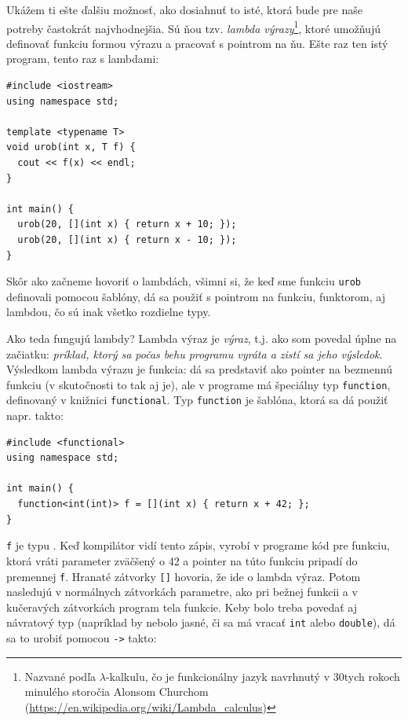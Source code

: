 \documentclass[10pt]{article}
\def\prg{\lstinline}
\def\ods{\vspace*{10pt}}
\begin{document}
{\ods
Ukážem ti ešte ďalšiu možnosť, ako dosiahnuť to isté, ktorá bude pre naše potreby
častokrát najvhodnejšia. Sú ňou tzv. {\em lambda výrazy}\footnote{%
  Nazvané podľa $\lambda$-kalkulu, čo je funkcionálny jazyk navrhnutý v 30tych rokoch
  minulého storočia Alonsom Churchom (\url{https://en.wikipedia.org/wiki/Lambda_calculus})
}, ktoré umožňujú definovať funkciu formou výrazu a pracovať s pointrom na ňu.
Ešte raz ten istý program, tento raz s lambdami:

\begin{lstlisting}
#include <iostream>
using namespace std;

template <typename T>
void urob(int x, T f) {
  cout << f(x) << endl;
}

int main() {
  urob(20, [](int x) { return x + 10; });
  urob(20, [](int x) { return x - 10; });
}
\end{lstlisting}

Skôr ako začneme hovoriť o lambdách, všimni si, že keď sme funkciu {\tt urob}
definovali pomocou šablóny, dá sa použiť s pointrom na funkciu, funktorom, aj lambdou,
čo sú inak všetko rozdielne typy.

\ods Ako teda fungujú lambdy? Lambda výraz je {\em výraz}, t.j. ako som povedal úplne 
na začiatku: {\em príklad, ktorý
sa počas behu programu vyráta a zistí sa jeho výsledok}. Výsledkom lambda výrazu je 
funkcia: dá sa predstaviť ako pointer na bezmennú funkciu (v skutočnosti to tak aj je),
ale v programe má špeciálny typ {\tt function}, definovaný v knižnici {\tt functional}.
Typ {\tt function} je šablóna, ktorá sa dá použiť napr. takto:

\begin{lstlisting}
#include <functional>
using namespace std;

int main() {
  function<int(int)> f = [](int x) { return x + 42; };
}
\end{lstlisting}


{\tt f} je typu \cmd{funkcia, ktorá má parameter \prg!int! a vracia \prg!int!}.
Keď kompilátor vidí tento zápis, vyrobí v programe kód pre funkciu, ktorá vráti 
parameter zväčšený o 42 a pointer na túto funkciu pripadí do premennej {\tt f}.
Hranaté zátvorky {\tt []} hovoria, že ide o lambda výraz. Potom nasledujú
v normálnych zátvorkách parametre, ako pri bežnej funkcii a v kučeravých zátvorkách program
tela funkcie. Keby bolo treba povedať aj návratový typ (napríklad by nebolo
jasné, či sa má vracať \prg!int! alebo \prg!double!), dá sa to urobiť pomocou {\tt ->}
takto:

}
\end{document}
